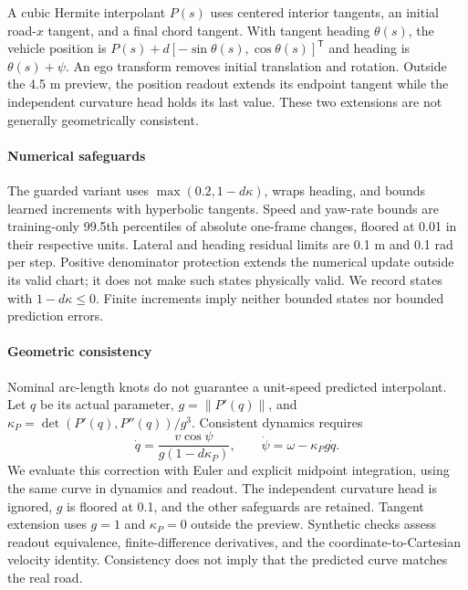 \documentclass[preprint,12pt]{elsarticle}
\begin{document}
A cubic Hermite interpolant $P(s)$ uses centered interior tangents, an initial
road-$x$ tangent, and a final chord tangent. With tangent heading $\theta(s)$,
the vehicle position is $P(s)+d[-\sin\theta(s),\cos\theta(s)]^{\mathsf T}$ and
heading is $\theta(s)+\psi$. An ego transform removes initial translation and
rotation. Outside the 4.5 m preview, the position readout extends its endpoint
tangent while the independent curvature head holds its last value. These two
extensions are not generally geometrically consistent.

\paragraph{Numerical safeguards}
The guarded variant uses $\max(0.2,1-d\kappa)$, wraps heading, and bounds learned
increments with hyperbolic tangents. Speed and yaw-rate bounds are training-only
99.5th percentiles of absolute one-frame changes, floored at 0.01 in their
respective units. Lateral and heading residual limits are 0.1 m and 0.1 rad
per step. Positive denominator protection extends the numerical update outside
its valid chart; it does not make such states physically valid. We record states
with $1-d\kappa\leq0$. Finite increments imply neither bounded states nor
bounded prediction errors.

\paragraph{Geometric consistency}
Nominal arc-length knots do not guarantee a unit-speed predicted interpolant.
Let $q$ be its actual parameter, $g=\|P'(q)\|$, and
$\kappa_P=\det(P'(q),P''(q))/g^3$. Consistent dynamics requires
\begin{equation}
 \dot q=\frac{v\cos\psi}{g(1-d\kappa_P)},\qquad
 \dot\psi=\omega-\kappa_Pg\dot q.\label{eq:consistent_geometry}
\end{equation}
We evaluate this correction with Euler and explicit midpoint integration, using
the same curve in dynamics and readout. The independent curvature head is
ignored, $g$ is floored at 0.1, and the other safeguards are retained.
Tangent extension uses $g=1$ and $\kappa_P=0$ outside the preview.
Synthetic checks assess readout equivalence, finite-difference derivatives,
and the coordinate-to-Cartesian velocity identity. Consistency does not imply
that the predicted curve matches the real road.
\end{document}
